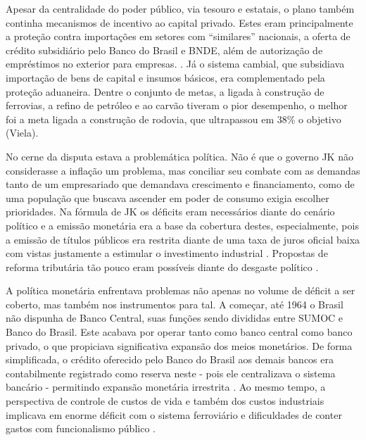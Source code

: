 Apesar da centralidade do poder público, via tesouro e estatais, o plano
também continha mecanismos de incentivo ao capital privado. Estes eram
principalmente a proteção contra importações em setores com
``similares'' nacionais, a oferta de crédito subsidiário pelo Banco do
Brasil e BNDE, além de autorização de empréstimos no exterior para
empresas. \citep{abreu_ordem_2014}. Já o sistema cambial, que subsidiava importação de
bens de capital e insumos básicos, era complementado pela proteção
aduaneira. Dentre o conjunto de metas, a ligada à construção de
ferrovias, a refino de petróleo e ao carvão tiveram o pior desempenho, o
melhor foi a meta ligada a construção de rodovia, que ultrapassou em
38\% o objetivo (Viela). 

No cerne da disputa estava a problemática política. Não é que o governo
JK não considerasse a inflação um problema, mas conciliar seu combate
com as demandas tanto de um empresariado que demandava crescimento e
financiamento, como de uma população que buscava ascender em poder de
consumo exigia escolher prioridades. Na fórmula de JK os déficits eram
necessários diante do cenário político e a emissão monetária era a base
da cobertura destes, especialmente, pois a emissão de títulos públicos
era restrita diante de uma taxa de juros oficial baixa com vistas
justamente a estimular o investimento industrial \citep{abreu_ordem_2014}. Propostas de
reforma tributária tão pouco eram possíveis diante do desgaste político
\citep{villela_dos_2025}.

A política monetária enfrentava problemas não apenas no volume de
déficit a ser coberto, mas também nos instrumentos para tal. A começar,
até 1964 o Brasil não dispunha de Banco Central, suas funções sendo
divididas entre SUMOC e Banco do Brasil. Este acabava por operar tanto
como banco central como banco privado, o que propiciava significativa
expansão dos meios monetários. De forma simplificada, o crédito
oferecido pelo Banco do Brasil aos demais bancos era contabilmente
registrado como reserva neste - pois ele centralizava o sistema bancário
- permitindo expansão monetária irrestrita \citep{abreu_ordem_2014}. Ao mesmo tempo, a
perspectiva de controle de custos de vida e também dos custos
industriais implicava em enorme déficit com o sistema ferroviário e
dificuldades de conter gastos com funcionalismo público \citep{abreu_ordem_2014}.

